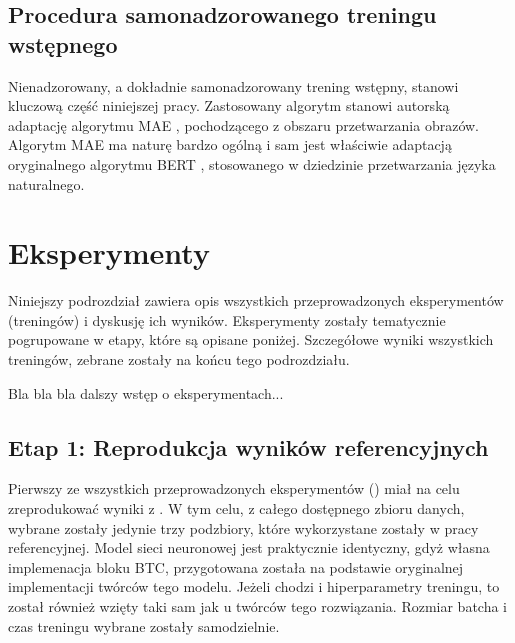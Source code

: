 \subsection{Procedura samonadzorowanego treningu wstępnego}

Nienadzorowany, a dokładnie samonadzorowany trening wstępny, stanowi kluczową część niniejszej
pracy. Zastosowany algorytm stanowi autorską adaptację algorytmu MAE \cite{he_masked_2021},
pochodzącego z obszaru przetwarzania obrazów. Algorytm MAE ma naturę bardzo ogólną i sam jest
właściwie adaptacją oryginalnego algorytmu BERT \cite{devlin_bert_2019}, stosowanego w dziedzinie
przetwarzania języka naturalnego.


\section{Eksperymenty}

Niniejszy podrozdział zawiera opis wszystkich przeprowadzonych eksperymentów (treningów) i dyskusję
ich wyników.  Eksperymenty zostały tematycznie pogrupowane w etapy, które są opisane poniżej.
Szczegółowe wyniki wszystkich treningów, zebrane zostały na końcu tego podrozdziału.

Bla bla bla dalszy wstęp o eksperymentach... %

\subsection{Etap 1: Reprodukcja wyników referencyjnych}

Pierwszy ze wszystkich przeprowadzonych eksperymentów () miał na
celu zreprodukować wyniki z \cite{park_bi-directional_2019}. W tym celu, z całego dostępnego zbioru
danych, wybrane zostały jedynie trzy podzbiory, które wykorzystane zostały w pracy referencyjnej.
Model sieci neuronowej jest praktycznie identyczny, gdyż własna implemenacja bloku BTC, przygotowana
została na podstawie oryginalnej implementacji twórców tego modelu. Jeżeli chodzi i hiperparametry
treningu, to  został również wzięty taki sam jak u twórców tego rozwiązania. Rozmiar batcha
i czas treningu wybrane zostały samodzielnie.
